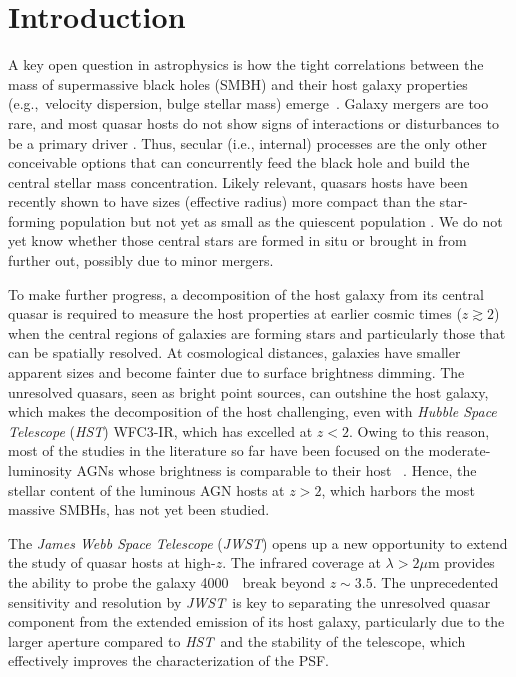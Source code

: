 \documentclass[twocolumn,]{aastex631}
\newcommand{\hst}{{\it HST}}
\newcommand{\jwst}{{\it JWST}}
\newcommand{\angstrom}{\text{\normalfont\AA}}
\begin{document}
\section{Introduction} \label{sec:intro}

A key open question in astrophysics is how the tight correlations between the mass of supermassive black holes (SMBH) and their host galaxy properties (e.g.,~velocity dispersion, bulge stellar mass) emerge~\citep[e.g.,~][]{Mag++98, F+M00, M+H03, H+R04, Gul++09, Geb++01b, Gra++2011,Beifi2012}. Galaxy mergers are too rare, and most quasar hosts do not show signs of interactions or disturbances to be a primary driver \citep[e.g.,][]{Cisternas2011,Kocevski2012,Mechtley2016}. Thus, secular (i.e., internal) processes are the only other conceivable options that can concurrently feed the black hole and build the central stellar mass concentration. Likely relevant, quasars hosts have been recently shown to have sizes (effective radius) more compact than the star-forming population but not yet as small as the quiescent population \citep{Silverman2019,Li2021}. We do not yet know whether those central stars are formed in situ or brought in from further out, possibly due to minor mergers. 


To make further progress, a decomposition of the host galaxy from its central quasar is required to measure the host properties at earlier cosmic times ($z\gtrsim2$) when the central regions of galaxies are forming stars and particularly those that can be spatially resolved. At cosmological distances, galaxies have smaller apparent sizes and become fainter due to surface brightness dimming. The unresolved quasars, seen as bright point sources, can outshine the host galaxy, which makes the decomposition of the host challenging, even with {\it Hubble Space Telescope} (\hst) WFC3-IR, which has excelled at $z < 2$. Owing to this reason, most of the studies in the literature so far have been focused on the moderate-luminosity AGNs whose brightness is comparable to their host ~\citep{Park15, Tre++07, Bennert11, Woo++08, Jah++09, SS13, Mechtley2016,Ding2020, Ding2021, 2021ApJ...906..103L}. Hence, the stellar content of the luminous AGN hosts at $z>2$, which harbors the most massive SMBHs, has not yet been studied. 

The {\it James Webb Space Telescope} (\jwst) opens up a new opportunity to extend the study of quasar hosts at high-$z$. The infrared coverage at $\lambda > 2 \mu$m provides the ability to probe the galaxy 4000~\angstrom\ break beyond $z\sim 3.5$.  The unprecedented sensitivity and resolution by \jwst\ is key to separating the unresolved quasar component from the extended emission of its host galaxy, particularly due to the larger aperture compared to \hst\ and the stability of the telescope, which effectively improves the characterization of the PSF. 
\end{document}
